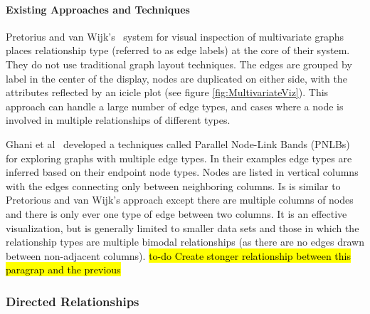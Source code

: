 \paragraph*{Existing Approaches and Techniques}
Pretorius and van Wijk's~\cite{pretorius2008} system for visual inspection of multivariate graphs places relationship type (referred to as edge labels) at the core of their system.
They do not use traditional graph layout techniques.
The edges are grouped by label in the center of the display, nodes are duplicated on either side, with the attributes reflected by an icicle plot (see figure \ref{fig:MultivariateViz}).
This approach can handle a large number of edge types, and cases where a node is involved in multiple relationships of different types.

Ghani et al~\cite{Ghani2013} developed a techniques called Parallel Node-Link Bands (PNLBs) for exploring graphs with multiple edge types. In their examples edge types are inferred based on their endpoint node types. Nodes are listed in vertical columns with  the edges connecting only between neighboring columns.
Is is similar to Pretorious and van Wijk's approach except there are multiple columns of nodes and there is only ever one type of edge between two columns. It is an effective visualization, but is generally limited to smaller data sets and  those in which the relationship types are multiple bimodal relationships (as there are no edges drawn between non-adjacent columns).
\hl{to-do Create stonger relationship between this paragrap and the previous}

\subsubsection*{Directed Relationships}

